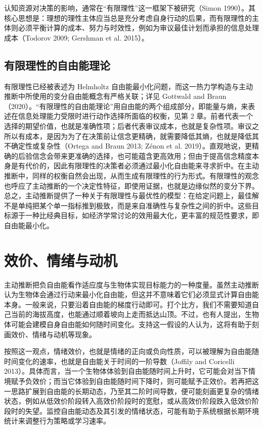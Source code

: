 认知资源对决策的影响，通常在“有限理性”这一框架下被研究（Simon 1990）。其核心思想是：理想的理性主体应当总是充分考虑自身行动的后果，而有限理性的主体则必须平衡计算的成本、努力与时效性，例如为审议最佳计划而承担的信息处理成本（Todorov 2009; Gershman et al. 2015）。

\subsection{有限理性的自由能理论}

有限理性已经被表述为 Helmholtz 自由能最小化问题，而这一热力学构造与主动推断中所使用的变分自由能概念有严格关联；详见 Gottwald and Braun（2020）。“有限理性的自由能理论”用自由能的两个组成部分，即能量与熵，来表述在信息处理能力受限时进行动作选择所面临的权衡，见第 2 章。前者代表一个选择的期望价值，也就是准确性项；后者代表审议成本，也就是复杂性项。审议之所以有成本，是因为为了在决策前让信念更精确，就需要降低其熵，也就是降低其不确定性或复杂性（Ortega and Braun 2013; Zénon et al. 2019）。直观地说，更精确的后验信念会带来更准确的选择，也可能蕴含更高效用；但由于提高信念精度本身是有代价的，因此有限理性的决策者必须通过最小化自由能来寻求折中。在主动推断中，同样的权衡自然会出现，从而生成有限理性的行为形式。有限理性的观念也呼应了主动推断的一个决定性特征，即使用证据，也就是边缘似然的变分下界。总之，主动推断提供了一种关于有限理性与最优性的模型：在给定问题上，最佳解不是单纯把某个单一指标推到极致，而是来自准确性与复杂性之间的折中。这些目标源于一种比经典目标，如经济学常讨论的效用最大化，更丰富的规范性要求，即自由能最小化。

\section{效价、情绪与动机}

主动推断把负自由能看作适应度与生物体实现目标能力的一种度量。虽然主动推断认为生物体会通过行动来最小化自由能，但这并不意味着它们必须显式计算自由能本身。一般来说，只要沿着自由能的梯度行动即可。打个比方，我们不需要知道自己当前的海拔高度，也能通过顺着坡向上走而抵达山顶。不过，也有人提出，生物体可能会建模自身自由能如何随时间变化。支持这一假设的人认为，这将有助于刻画效价、情绪与动机等现象。

按照这一观点，情绪效价，也就是情绪的正向或负向性质，可以被理解为自由能随时间变化的速率，也就是自由能关于时间的一阶导数（Joffily and Coricelli 2013）。具体而言，当一个生物体体验到自由能随时间上升时，它可能会对当下情境赋予负效价；而当它体验到自由能随时间下降时，则可能赋予正效价。若再把这一思路扩展到自由能的长期动态，乃至其二阶时间导数，便可能刻画更复杂的情绪状态，例如从低效价阶段转入高效价阶段时的宽慰，或从高效价阶段跌入低效价阶段时的失望。监控自由能动态及其引发的情绪状态，可能有助于系统根据长期环境统计来调整行为策略或学习速率。

